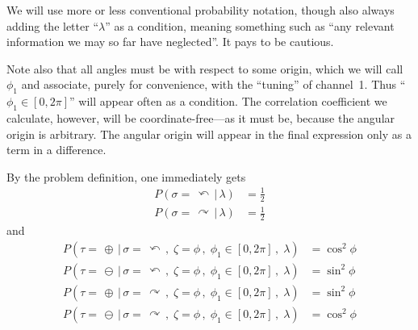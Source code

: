 \documentclass[9pt,technote]{IEEEtran}
\begin{document}
We will use more or less conventional probability notation, though
also always adding the letter ``$\lambda$'' as a condition, meaning
something such as ``any relevant information we may so far have
neglected''. It pays to be cautious.

Note also that all angles must be with respect to some origin, which
we will call $\phi_1$ and associate, purely for convenience, with the
``tuning'' of channel~1. Thus ``$\phi_1\in[0,2\pi]$'' will appear
often as a condition. The correlation coefficient we calculate,
however, will be coordinate-free---as it must be, because the angular
origin is arbitrary. The angular origin will appear in the final
expression only as a term in a difference.

By the problem definition, one immediately gets
\begin{align}
  P(\sigma=\,\curvearrowleft \,|\, \lambda) &= \frac{1}{2} \\
  P(\sigma=\,\curvearrowright \,|\, \lambda) &= \frac{1}{2}
\end{align}
and
\begin{align}
  P(\tau=\,\oplus \,|\, \sigma=\,\curvearrowleft\,,\; \zeta=\phi\,,\; \phi_1\in[0,2\pi]\,,\; \lambda) &= \cos^2 \phi \\
  P(\tau=\,\ominus \,|\, \sigma=\,\curvearrowleft\,,\; \zeta=\phi\,,\; \phi_1\in[0,2\pi]\,,\; \lambda) &= \sin^2 \phi \\
  P(\tau=\,\oplus \,|\, \sigma=\,\curvearrowright\,,\; \zeta=\phi\,,\; \phi_1\in[0,2\pi]\,,\; \lambda) &= \sin^2 \phi \\
  P(\tau=\,\ominus \,|\, \sigma=\,\curvearrowright\,,\; \zeta=\phi\,,\; \phi_1\in[0,2\pi]\,,\; \lambda) &= \cos^2 \phi
\end{align}
\end{document}
